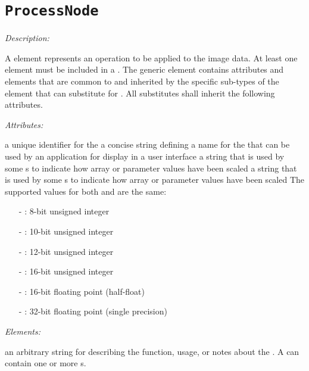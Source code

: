 \section{\texttt{ProcessNode}}
\label{sec:ProcessNode}

\emph{Description:} \par
A  element represents an operation to be applied to the image data. At least one  element must be included in a . The generic  element contains attributes and elements that are common to and inherited by the specific sub-types of the  element that can substitute for . All  substitutes shall inherit the following attributes.

\emph{Attributes:}
\label{sec:process-node-attr}
\begin{xmlfields}
    \xmlitem[id][optional]  a unique identifier for the 
    \xmlitem[name][optional] a concise string defining a name for the  that can be used by an application for display in a user interface
    \xmlitem[inBitDepth][required] a string that is used by some s to indicate how array or parameter values have been scaled
    \xmlitem[outBitDepth][required] a string that is used by some s to indicate how array or parameter values have been scaled
    The supported values for both  and  are the same:
        \begin{itemize}
            \item[-] : 8-bit unsigned integer
            \item[-] : 10-bit unsigned integer
            \item[-] : 12-bit unsigned integer
            \item[-] : 16-bit unsigned integer
            \item[-] : 16-bit floating point (half-float)
            \item[-] : 32-bit floating point (single precision)
        \end{itemize}
\end{xmlfields}

\emph{Elements:}
\label{sec:process-node-elements}
\begin{xmlfields}
    \xmlitem[Description][optional] an arbitrary string for describing the function, usage, or notes about the . A  can contain one or more s.
\end{xmlfields}